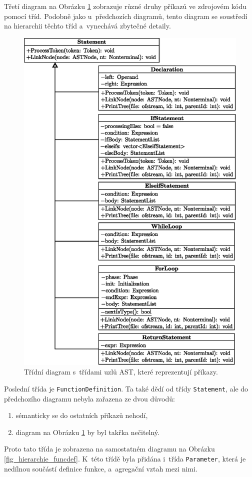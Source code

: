 Třetí diagram na Obrázku \ref{fig_hierarchie_statement} zobrazuje různé druhy příkazů ve zdrojovém kódu pomocí tříd.
Podobně jako u~předchozích diagramů, tento diagram se soustředí na hierarchii těchto tříd a~vynechává zbytečné detaily.
\begin{figure}[h!]
		\centering
		\includegraphics[height=0.88\textheight]{obrazky-figures/statement_hierarchy.eps}
		\caption{Třídní diagram s~třídami uzlů AST, které reprezentují příkazy.}
		\label{fig_hierarchie_statement}
\end{figure}

\newpage

Poslední třída je \texttt{FunctionDefinition}.
Ta také dědí od třídy \texttt{Statement}, ale do předchozího diagramu nebyla zařazena ze dvou důvodů:
\begin{enumerate}
	\item sémanticky se do ostatních příkazů nehodí,
	\item diagram na Obrázku \ref{fig_hierarchie_statement} by byl takřka nečitelný.
\end{enumerate}
Proto tato třída je zobrazena na samostatném diagramu na Obrázku \ref{fig_hierarchie_funcdef}.
K~této třídě byla přidána i~třída \texttt{Parameter}, která je nedílnou součástí definice funkce, a~agregační vztah mezi nimi.

